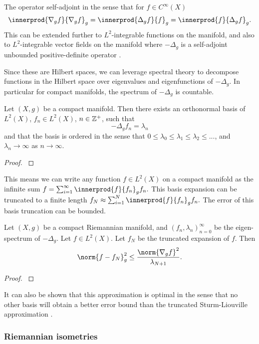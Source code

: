 The operator self-adjoint in the sense that for \(f\in C^\infty(X)\) \[\innerprod{\nabla_g f}{\nabla_g f}_g = \innerprod{\Delta_g f}{f}_g = \innerprod{f}{\Delta_g f}_g.\]
This can be extended further to \(L^2\)-integrable functions on the manifold, and also to \(L^2\)-integrable vector fields on the manifold where \(-\Delta_g\) is a self-adjoint unbounded positive-definite operator \cite[theorem 2.4]{strichartz1983analysis}.

Since these are Hilbert spaces, we can leverage spectral theory to decompose functions in the Hilbert space over eigenvalues and eigenfunctions of \(-\Delta_g\).
In particular for compact manifolds, the spectrum of \(-\Delta_g\) is countable.
\begin{theorem}
	\label{thm:strum-liouville}
	Let \((X, g)\) be a compact manifold.
	Then there exists an orthonormal basis of \(L^2(X)\), \(f_n\in L^2(X)\), \(n\in \mathbb{Z}^+\), such that
	\[-\Delta_g f_n = \lambda_n\]
	and that the basis is ordered in the sense that \(0 \leq \lambda_0 \leq \lambda_1 \leq \lambda_2 \leq ...\), and \(\lambda_n\to \infty\) as \(n\to \infty\).
\end{theorem}
\begin{proof}
	\textcite{chavel1984eigenvalues}
\end{proof}
This means we can write any function \(f\in L^2(X)\) on a compact manifold as the infinite sum
\(f = \sum_{i=1}^\infty \innerprod{f}{f_n}_g f_n.\)
This basis expansion can be truncated to a finite length
\(f_N \approx \sum_{i=1}^N \innerprod{f}{f_n}_g f_n.\)
The error of this basis truncation can be bounded.
\begin{theorem}
	Let \((X, g)\) be a compact Riemannian manifold, and \((f_n, \lambda_n)_{n=0}^\infty\) be the eigen-spectrum of \(-\Delta_g\).
	Let \(f \in L^2(X)\).
	Let \(f_N\) be the truncated expansion of \(f\).
	Then
	\[
		\norm{f - f_N}_g^2 \leq \frac{\norm{\nabla_g f}^2}{\lambda_{N+1}}.	
	\]
\end{theorem}
\begin{proof}
	\cite{aflalo2013spectral}
\end{proof}
It can also be shown that this approximation is optimal in the sense that no other basis will obtain a better error bound than the truncated Sturm-Liouville approximation \cite{aflalo2015optimality}.

\subsubsection{Riemannian isometries}

